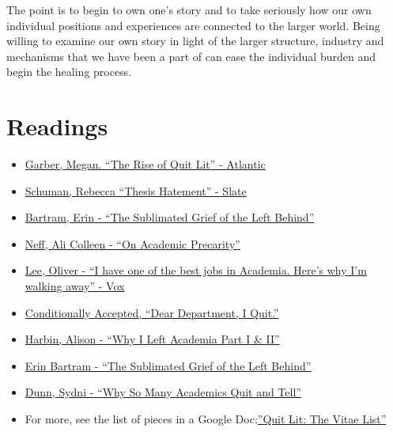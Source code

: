 \documentclass[]{book}
\providecommand{\tightlist}{%
  \setlength{\itemsep}{0pt}\setlength{\parskip}{0pt}}
\theoremstyle{definition}
\theoremstyle{definition}
\theoremstyle{definition}
\theoremstyle{remark}
\begin{document}
The point is to begin to own one's story and to take seriously how our
own individual positions and experiences are connected to the larger
world. Being willing to examine our own story in light of the larger
structure, industry and mechanisms that we have been a part of can ease
the individual burden and begin the healing process.

\section{Readings}\label{readings}

\begin{itemize}
\tightlist
\item
  \href{https://www.theatlantic.com/entertainment/archive/2015/09/dont-quit-your-day-job/404671/}{Garber,
  Megan. ``The Rise of Quit Lit'' - Atlantic}
\item
  \href{http://www.slate.com/articles/life/culturebox/2013/04/there_are_no_academic_jobs_and_getting_a_ph_d_will_make_you_into_a_horrible.html}{Schuman,
  Rebecca ``Thesis Hatement'' - Slate}
\item
  \href{http://erinbartram.com/uncategorized/the-sublimated-grief-of-the-left-behind/}{Bartram,
  Erin - ``The Sublimated Grief of the Left Behind''}
\item
  \href{http://www.alicolleenneff.com/blog/2017/11/8/on-academic-precarity}{Neff,
  Ali Colleen - ``On Academic Precarity''}
\item
  \href{\%20https://www.vox.com/2015/9/8/9261531/professor-quitting-job}{Lee,
  Oliver - ``I have one of the best jobs in Academia. Here's why I'm
  walking away'' - Vox}
\item
  \href{\%20https://conditionallyaccepted.com/2015/06/16/quit/}{Conditionally
  Accepted, ``Dear Department, I Quit.''}
\item
  \href{\%20https://www.allisonharbin.com/post-phd/why-i-left-academia-part-1}{Harbin,
  Alison - ``Why I Left Academia Part I \& II''}
\item
  \href{http://erinbartram.com/uncategorized/the-sublimated-grief-of-the-left-behind/}{Erin
  Bartram - ``The Sublimated Grief of the Left Behind''}
\item
  \href{https://chroniclevitae.com/news/216-why-so-many-academics-quit-and-tell}{Dunn,
  Sydni - ``Why So Many Academics Quit and Tell''}
\item
  For more, see the list of pieces in a Google
  Doc:\href{\%20https://docs.google.com/spreadsheets/d/1OODoiZKeAtiGiI3IAONCspryCHWo5Yw9xkQzkRntuMU/edit\#gid=0}{''Quit
  Lit: The Vitae List''}
\end{itemize}
\end{document}
